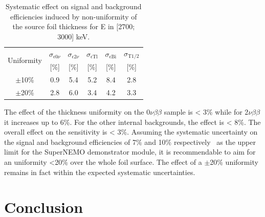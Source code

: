 \documentclass[main.tex]{subfiles}
\begin{document}
\begin{table}[h!]
\centering
\begin{tabular}{c|c|c|c|c|c}
\toprule
\multirow{2}{*}{Uniformity} & $\sigma_{\epsilon \text{0}\nu}$ & $\sigma_{\epsilon \text{2}\nu}$ & $\sigma_{\epsilon \text{Tl}}$ & $\sigma_{\epsilon \text{Bi}}$ & $\sigma_{\text{T1/2}}$ \\
  & [\%]  & [\%]  & [\%]  & [\%]  & [\%]  \\[0.1cm]
\hline 
$\pm$10\% & 0.9 & 5.4 & 5.2 & 8.4 & 2.8 \\[0.1cm]
\hline 
$\pm$20\% & 2.8 & 6.0 & 3.4 & 4.2 & 3.3 \\[0.1cm]
\bottomrule
\end{tabular}
\caption{Systematic effect on signal and background efficiencies induced by non-uniformity of the source foil thickness for E  in [2700; 3000] keV.}
\label{Tab:SystematicInfluence}
\end{table}


\NI  The effect of the thickness uniformity on the 0$\nu\beta\beta$ sample is < 3\% while for 2$\nu\beta\beta$ it increases up to 6\%. For the other internal backgrounds, the effect is < 8\%. The overall effect on the sensitivity is < 3\%. Assuming the systematic uncertainty on the signal and background efficiencies of 7\% and 10\% respectively~\cite{NEMO3:Mo100} as the upper limit for the SuperNEMO demonstrator module, it is recommendable to aim for an uniformity <20\% over the whole foil surface. The effect of a $\pm$20\% uniformity remains in fact within the expected systematic uncertainties.%


\FloatBarrier


\section{Conclusion}\label{sec:SourceFoilDesignConclusion}
\end{document}
